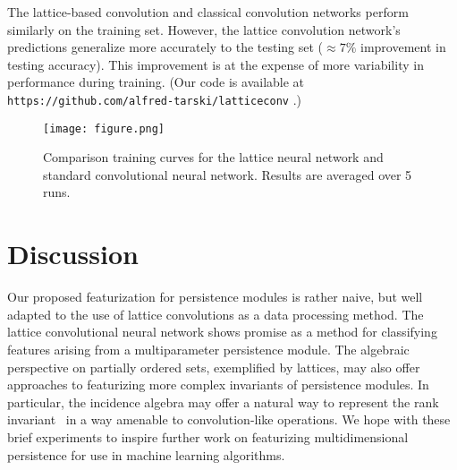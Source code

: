 \documentclass{article}
\begin{document}
The lattice-based convolution and classical convolution networks perform
similarly on the training set. However, the lattice convolution network's
predictions generalize more accurately to the testing set ($\approx 7\%$ improvement in testing accuracy).
This improvement is  at the expense of more variability in performance during
training. (Our code is available at \texttt{https://github.com/alfred-tarski/latticeconv} .)

\begin{figure}[h]
  \caption{Comparison training curves for the lattice neural network and
    standard convolutional neural network. Results are averaged over 5 runs.}\label{fig:comparison}
    \begin{center}
	\texttt{[image: figure.png]}
    \end{center}
\end{figure}
\section{Discussion}
Our proposed featurization for persistence modules is rather naive, but well
adapted to the use of lattice convolutions as a data processing method. The
lattice convolutional neural network shows promise as a method for classifying
features arising from a multiparameter persistence module. The algebraic
perspective on partially ordered sets, exemplified by lattices, may also offer
approaches to featurizing more complex invariants of persistence modules. In
particular, the incidence algebra may offer a natural way to represent the rank
invariant~\cite{carlsson_theory_2009} in a way amenable to convolution-like
operations.
We hope with these brief experiments to inspire further work on featurizing
multidimensional persistence for use in machine learning algorithms.

\newpage
\small


\end{document}
